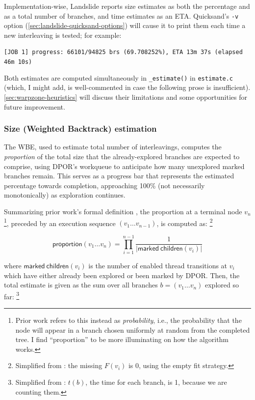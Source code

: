 Implementation-wise, Landslide reports size estimates as both the percentage and as a total number of branches,
and time estimates as an ETA.
Quicksand's {\tt -v} option (\cref{sec:landslide-quicksand-options})
will cause it to print them each time a new interleaving is tested; for example:
\begin{center}
	{\tt \small [JOB 1] progress: 66101/94825 brs (69.708252\%), ETA 13m 37s (elapsed 46m 10s)}
\end{center}
Both estimates are computed simultaneously in {\tt \_estimate()} in {\tt estimate.c}
(which, I might add, is well-commented in case the following prose is insufficient).
\cref{sec:warpzone-heuristics} will discuss their limitations and some opportunities for future improvement.

\subsubsection{Size (Weighted Backtrack) estimation}

The WBE, used to estimate total number of interleavings,
computes the {\em proportion} of the total size
that the already-explored branches are expected to comprise,
using DPOR's workqueue to anticipate how many unexplored marked branches remain.
This serves as a progress bar \cite{progress-bar} that represents the estimated percentage towards completion,
approaching 100\% (not necessarily monotonically) as exploration continues.

Summarizing prior work's formal definition \cite{estimation},
the proportion at a terminal node $v_n$%
\footnote{Prior work \cite{estimating-search-tree-size,estimation} refers to this instead as {\em probability},
i.e., the probability that the node will appear in a branch chosen uniformly at random from the completed tree.
I find ``proportion'' to be more illuminating on how the algorithm works.
},
preceded by an execution sequence $(v_1 \dots v_{n-1})$,
is computed as:%
\footnote{
Simplified from \cite{estimation}: the missing $F(v_i)$ is 0, using the empty fit strategy.
}

\[
	\mathsf{proportion}(v_1 \dots v_n) = \displaystyle\prod_{i=1}^{n-1} \frac{1}{|\mathsf{marked~children}(v_i)|}
\]

where $\mathsf{marked~children}(v_i)$ is the number of enabled thread transitions at $v_i$
which have either already been explored or been marked by DPOR.
Then, the total estimate is given as the sum over all branches $b = (v_1 \dots v_n)$ explored so far:%
\footnote{
Simplified from \cite{estimation}: $t(b)$, the time for each branch, is 1, because we are counting them.
}

